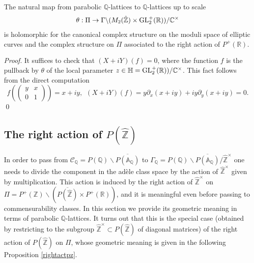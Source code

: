 \documentclass[graybox, envcountsect%
]{svmult}
\def\GL{{\rm GL}}
\def\A{{\mathbb A}}
\def\C{{\mathbb C}}
\def\Q{{\mathbb Q}}
\def\R{{\mathbb R}}
\def\Z{{\mathbb Z}}
\def\H{{\mathbb H}}
\def\hatz{{\hat\Z^\times}}
\def\cC{{\mathcal C}}
\def\gaq{{\Gamma_\Q}}
\def\caq{{\cC_\Q}}
\begin{document}
 \begin{proposition}\label{comparescalcs}
 	The natural map from parabolic $\Q$-lattices to $\Q$-lattices up to scale
 	\begin{equation}\label{P2gl2scalbis}
\theta:\Pi\to \Gamma\backslash
(M_2(\hat\Z)\times \GL_2^+(\R)) /\C^\times	
\end{equation}
is holomorphic for the canonical complex structure on the moduli space of elliptic curves and the complex structure on $\Pi$ associated to the right action of $P^+(\R)$.
\end{proposition}
\begin{proof} It suffices  to check that $(X+iY)(f)=0$, where the function $f$ is the pullback by $\theta$ of the local parameter $z\in \H=\GL_2^+(\R)) /\C^\times$. This fact follows from the direct computation
$$
f(\begin{pmatrix} y &x \\
0 &1
\end{pmatrix})=x+iy, \ \ (X+iY)(f)=y\partial_x (x+iy)+iy \partial_y (x+iy)=0.
$$ 
\qed\end{proof} 


 \subsection{The right action of $P(\hat \Z)$}\label{subsec:6.7}

In order to pass from $\caq=P(\Q)\backslash
\overline{P(\A_\Q)}$ to  $\gaq=P(\Q)\backslash
\overline{P(\A_\Q)}/\hatz$ one needs to divide the component in the ad\`ele class space by the action of $\hatz$ given by multiplication. This action is induced by the right action of $\hatz$  on  $\Pi=P^+(\Z)\backslash (\overline{P(\hat \Z)}\times P^+(\R))$, and it is meaningful even  before passing to commensurability classes. In this section we provide its geometric meaning  in terms of parabolic $\Q$-lattices.   
It turns out that this is the special case (obtained by restricting to the subgroup $\hatz\subset P(\hat \Z)$ of diagonal matrices) of the right action of $P(\hat \Z)$ on $\Pi$, whose  geometric meaning is given in the following Proposition \ref{rightactpz}.
\end{document}
